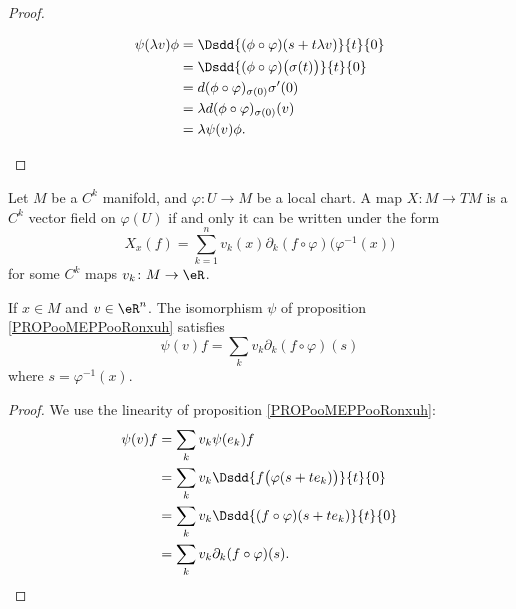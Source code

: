 \begin{proof}
\begin{subproof}
\begin{subequations}
            \begin{align}
                \psi(\lambda v)\phi&=\Dsdd{ (\phi\circ\varphi)(s+t\lambda v) }{t}{0}\\
                &=\Dsdd{ (\phi\circ\varphi)\big( \sigma(t) \big) }{t}{0}\\
                &=d(\phi\circ\varphi)_{\sigma(0)}\sigma'(0)\\
                &=\lambda d(\phi\circ\varphi)_{\sigma(0)}(v)\\
                &=\lambda\psi(v)\phi.
            \end{align}
        \end{subequations}
    \end{subproof}
\end{proof}

\begin{lemma}        \label{LEMooZWFAooDlYaJm}
    Let \( M\) be a \( C^k\) manifold, and \( \varphi\colon U\to M\) be a local chart. A map \( X\colon M\to TM\) is a \( C^k\) vector field on \( \varphi(U)\) if and only it can be written under the form
    \begin{equation}
        X_x(f)=\sum_{k=1}^nv_k(x)\partial_k(f\circ\varphi)\big( \varphi^{-1}(x) \big)
    \end{equation}
    for some \( C^k\) maps \( v_k\colon M\to \eR\).
\end{lemma}

\begin{lemma}       \label{LEMooIQZWooOSLNXB}
    If \( x\in M\) and \( v\in \eR^n\). The isomorphism \( \psi\) of proposition \ref{PROPooMEPPooRonxuh} satisfies
    \begin{equation}        \label{EQooBVOBooBTfYWC}
        \psi(v)f=\sum_kv_k\partial_k(f\circ\varphi)(s)
    \end{equation}
    where \( s=\varphi^{-1}(x)\).
\end{lemma}

\begin{proof}
    We use the linearity of proposition \ref{PROPooMEPPooRonxuh}:
    \begin{subequations}
        \begin{align}
            \psi(v)f&=\sum_kv_k\psi(e_k)f\\
            &=\sum_kv_k\Dsdd{ f\big( \varphi(s+te_k) \big) }{t}{0}\\
            &=\sum_kv_k\Dsdd{ (f\circ\varphi)(s+te_k) }{t}{0}\\
            &=\sum_kv_k\partial_k(f\circ\varphi)(s).
        \end{align}
    \end{subequations}
\end{proof}

